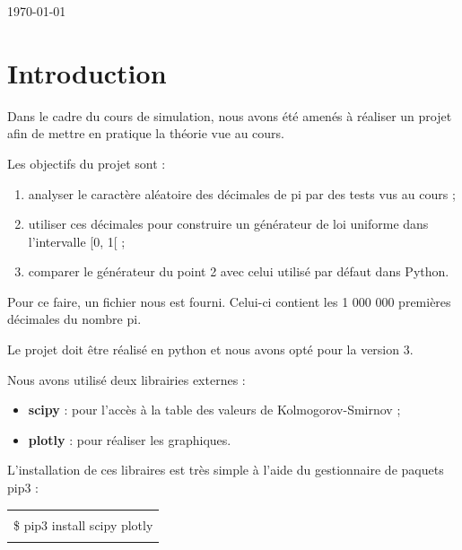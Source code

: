 \documentclass[10pt,a4paper]{article}
\begin{document}
\begin{titlepage}
\begin{center}
			\vfill
			
			{\large \today}
			
		\end{center}
	\end{titlepage}
	
	\newpage
	\tableofcontents
	
	\newpage
	\section{Introduction}
	Dans le cadre du cours de simulation, nous avons été amenés à réaliser un projet afin de mettre en pratique la théorie vue au cours.
	
	Les objectifs du projet sont :
	\begin{enumerate}
		\item analyser le caractère aléatoire des décimales de pi par des tests vus au cours ;
		\item utiliser ces décimales pour construire un générateur de loi uniforme dans l'intervalle [0, 1[ ;
		\item comparer le générateur du point 2 avec celui utilisé par défaut dans Python.
	\end{enumerate}
	
	Pour ce faire, un fichier nous est fourni. Celui-ci contient les 1 000 000 premières décimales du nombre pi.
	
	Le projet doit être réalisé en python et nous avons opté pour la version 3.

	Nous avons utilisé deux librairies externes :
	\begin{itemize}
		\item \textbf{scipy} : pour l'accès à la table des valeurs de Kolmogorov-Smirnov ;
		\item \textbf{plotly} : pour réaliser les graphiques.
	\end{itemize}
	
	L'installation de ces libraires est très simple à l'aide du gestionnaire de paquets pip3 :
	
	\begin{center}
		\begin{tabular}{|l|}
			\hline \\
			\$ pip3 install scipy plotly\\
			\\
			\hline
		\end{tabular}
	\end{center}
	
\end{document}
